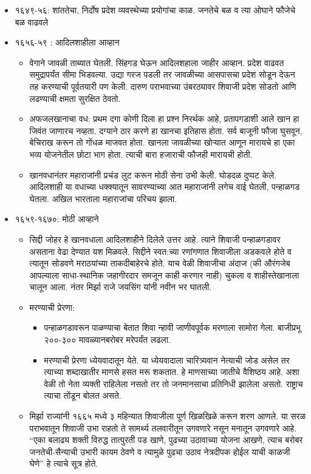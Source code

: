 \begin{itemize}
\item १६४९-५६: शांततेचा, निर्दोष प्रदेश व्यवस्थेच्या प्रयोगांचा काळ. जनतेचे बळ व त्या ओघाने फौजेचे बळ वाढवले
\item १६५६-५९  : आदिलशाहीला आव्हान
	\begin{itemize}
	\item वेगाने जावळी ताब्यात घेतली. सिंहगड घेऊन आदिलशहाला जाहीर आव्हान. प्रदेश वाढवत समुद्रापर्यंत सीमा भिडवल्या. उद्या गरज पडली तर जावळीच्या आसपासचा प्रदेश सोडून देऊन तह करण्याची पूर्वतयारी पण केली. दारुण पराभवाच्या उंबरठ्यावर शिवाजी प्रदेश सोडतो आणि लढण्याची क्षमता सुरक्षित ठेवतो.
	\item अफजलखानाचा वध: प्रथम दगा कोणी दिला हा प्रश्न निरर्थक आहे, प्रतापगडाशी आले खान हा जिवंत जाणारच नव्हता. दग्याने ठार करणे हा खानचा इतिहास होता. सर्व बाजूनी फौजा घुसवून, बेचिराख करून तो गोंधळ माजवत होता. खानला जावळीच्या खोऱ्यात आणून मारायचे हा एका भव्य योजनेतील छोटा भाग होता. त्याची बारा हजाराची फौजही मारायची होती.
	\item खानवधानंतर महाराजांनी प्रचंड लुट करून मोठी सेना उभी केली. घोडदळ दुप्पट केले. आदिलशाही या वधाच्या धक्क्यातून सावरण्याच्या आत महाराजांनी लगेच वाई घेतली, पन्हाळगड घेतला. अखिल भारताला महाराजांचा परिचय झाला.
	\end{itemize}

\item १६५९-१६७०: मोठी आव्हाने
	\begin{itemize}
	\item सिद्दी जोहर हे खानवधाला आदिलशाहीने दिलेले उत्तर आहे. त्याने शिवाजी पन्हाळगडावर असताना वेढा देण्यात यश मिळवले. सिद्दीने स्वत:च्या रणांगणात शिवाजीला अडकवले होते व त्यातून सोडवणे मराठयांच्या ताकदीबाहेरचे होते. याच वेळी शिवाजीचा अंदाज (की औरंगजेब आपल्याला साधा-स्थानिक जहागीरदार समजून काही करणार नाही) चुकला व शाहीस्तेखानाला चालून आला. नंतर मिर्झा राजे जयसिंग यांनी नवीन भर घातली.
	\item मरण्याची प्रेरणा:
		\begin{itemize}
		\item पन्हाळगडावरून पाळण्याचा बेतात शिवा न्हावी जाणीवपूर्वक मरणाला सामोरा गेला. बाजीप्रभू २००-३०० मावळ्यानबरोबर मरेपर्यंत लढला.
		\item मरण्याची प्रेरणा ध्येयवादातून येते. या ध्येयवादाला चारित्र्यवान नेत्याची जोड असेल तर त्याच्या शब्दाखातीर माणसे हसत मरू शकतात. हे माणसाच्या जातीचे वैशिष्ठय आहे. अशा वेळी तो नेता व्यक्ती राहिलेला नसतो तर तो जनमानसाचा प्रतिनिधी झालेला असतो. राष्ट्राच त्याचा तोंडून बोलत असते.
		\end{itemize}

	\item मिर्झा राज्यांनी १६६५ मध्ये ३ महिन्यात शिवाजीला पूर्ण खिळखिळे करून शरण आणले. या सरळ पराभवातून शिवाजी उभा राहतो ते सामर्थ्य तलवारीतून उगवणारे नसून मनातून उगवणारे आहे. “एका बलाढ्य शक्ती विरुद्ध तात्पुरती पड खाणे, पुढच्या उठावाच्या योजना आखणे, त्याच बरोबर जनतेची-सैन्याची उभारी कायम ठेवणे व त्यामुळे पुढचा उठाव नेत्रदीपक होईल याची काळजी घेणे”  हे त्याचे सूत्र होते.
	\end{itemize}


\end{itemize}
